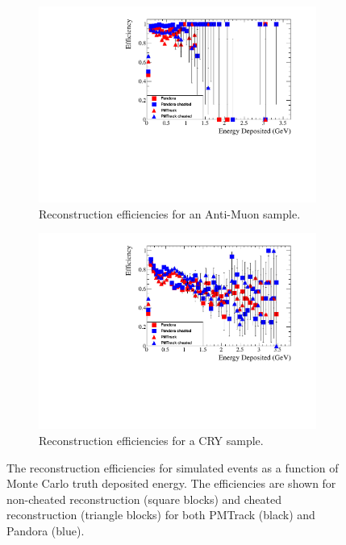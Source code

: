 \begin{figure}[h!]
  \centering
  \begin{subfigure}{0.45\textwidth}
    \centering
    \includegraphics[width=\textwidth]{Effic_AntiMuon_500V_All_EnDepos}
    \caption{Reconstruction efficiencies for an Anti-Muon sample.}
    \label{fig:SimEffic_EnDepos_AMu}
  \end{subfigure}
  \hspace{0.08\textwidth}
  \begin{subfigure}{0.45\textwidth}
    \centering
    \includegraphics[width=\textwidth]{Effic_Cosmics_500V_All_EnDepos}
    \caption{Reconstruction efficiencies for a CRY sample.}
    \label{fig:SimEffic_EnDepos_CRY}
  \end{subfigure}
  \caption[The reconstruction efficiencies for simulated events as a function of Monte Carlo truth deposited energy.]
          {The reconstruction efficiencies for simulated events as a function of Monte Carlo truth deposited energy. The efficiencies are shown for non-cheated reconstruction (square blocks) and cheated reconstruction (triangle blocks) for both PMTrack (black) and Pandora (blue).}
          \label{fig:SimEffic_EnDepos}
\end{figure}

